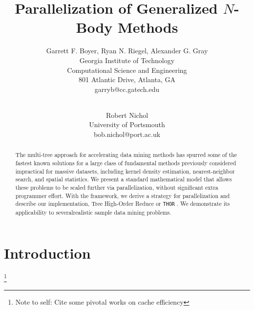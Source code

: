 \documentclass[twoside,leqno,twocolumn]{article}
\newcommand{\THOR}{{{\tt THOR}} }
\newcommand{\authornote}[1]{\footnote{Note to self: #1}}
\newcommand{\authorsnote}[1]{\authornote{#1}}
\begin{document}
\title{Parallelization of Generalized $N$-Body Methods}

\author{Garrett F. Boyer, Ryan N. Riegel, Alexander G. Gray
\\ Georgia Institute of Technology
\\ Computational Science and Engineering
\\ 801 Atlantic Drive, Atlanta, GA
\\ garryb@cc.gatech.edu
\\
\and
\\ Robert Nichol
\\ University of Portsmouth
\\ bob.nichol@port.ac.uk
}

\maketitle
\thispagestyle{empty}

\begin{abstract}
The multi-tree approach for accelerating data mining methods has spurred some of the fastest known solutions for a large class of fundamental methods previously considered impractical for massive datasets, including kernel density estimation, nearest-neighbor search, and spatial statistics.
We present a standard mathematical model that allows these problems to be scaled further via parallelization, without significant extra programmer effort.
With the framework, we derive a strategy for parallelization and describe our implementation, Tree High-Order Reduce or \THOR.
We demonstrate its applicability to severalrealistic sample data mining problems.
\end{abstract}

\section{Introduction}

\authorsnote{Cite some pivotal works on cache efficiency}
\end{document}
